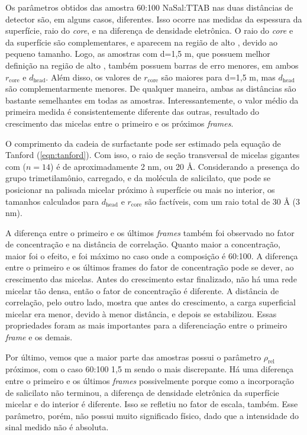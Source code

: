 	Os parâmetros obtidos das amostra 60:100 NaSal:TTAB nas duas distâncias de detector são, em alguns casos, diferentes. Isso ocorre nas medidas da espessura da superfície, raio do \emph{core}, e na diferença de densidade eletrônica. O raio do \emph{core} e da superfície são complementares, e aparecem na região de alto \q, devido ao pequeno tamanho. Logo, as amostras com d=1,5 m, que possuem melhor definição na região de alto \q, também possuem barras de erro menores, em ambos \(r_{\mathrm{core}}\) e \(d_{\mathrm{head}}\). Além disso, os valores de \(r_{\mathrm{core}}\) são maiores para d=1,5 m, mas \(d_\mathrm{head}\) são complementarmente menores. De qualquer maneira, ambas as distâncias são bastante semelhantes em todas as amostras. Interessantemente, o valor médio da primeira medida é consistentemente diferente das outras, resultado do crescimento das micelas entre o primeiro e os próximos \emph{frames}.
	
	O comprimento da cadeia de surfactante pode ser estimado pela equação de Tanford (\autoref{eqn:tanford}). Com isso, o raio de seção transversal de micelas gigantes com \TTAB{} (\(n=14\)) é de aproximadamente 2 nm, ou 20 \AA. Considerando a presença do grupo trimetilamônio, carregado, e da molécula de salicilato, que pode se posicionar na palisada micelar próximo à superfície ou mais no interior, os tamanhos calculados para \(d_{\mathrm{head}}\) e \(r_{\mathrm{core}}\) são factíveis, com um raio total de 30 \AA{} (3 nm).

	A diferença entre o primeiro e os últimos \emph{frames} também foi observado no fator de concentração e na distância de correlação. Quanto maior a concentração, maior foi o efeito, e foi máximo no caso onde a composição é 60:100. A diferença entre o primeiro e os últimos frames do fator de concentração pode se dever, ao crescimento das micelas. Antes do crescimento estar finalizado, não há uma rede micelar tão densa, então o fator de concentração é diferente. A distância de correlação, pelo outro lado, mostra que antes do crescimento, a carga superficial micelar era menor, devido à menor distância, e depois se estabilizou. Essas propriedades foram as mais importantes para a diferenciação entre o primeiro \emph{frame} e os demais.
	
	Por último, vemos que a maior parte das amostras possui o parâmetro \(\rho_{\mathrm{rel}}\) próximos, com o caso 60:100 1,5 m sendo o mais discrepante. Há uma diferença entre o primeiro e os últimos \emph{frames} possivelmente porque como a incorporação de salicilato não terminou, a diferença de densidade eletrônica da superfície micelar e do interior é diferente. Isso se refletiu no fator de escala, também. Esse parâmetro, porém, não possui muito significado físico, dado que a intensidade do sinal medido não é absoluta.
	
